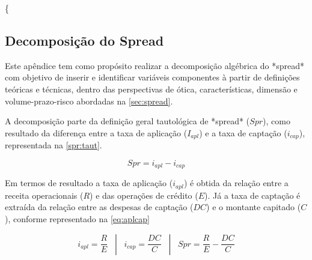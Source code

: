 \documentclass[
  12pt,
  12pt,
  openright,
  oneside,
  a4paper,
  chapter=TITLE,
  section=TITLE,
  subsection=TITLE,
  subsubsection=TITLE,
  english,
  portugues,
  sumario=tradicional]{abntex2}
\begin{document}
\postextual

\printbibliography[title={REFERÊNCIAS}]

\postextual



\{

\begin{apendicesenv}

\vspace{-10mm}

\renewcommand{\thechapter}{\arabic{chapter}}

\chapter{Decomposição do Spread}\label{apendicea}

Este apêndice tem como propósito realizar a decomposição algébrica do *spread* com objetivo de inserir e identificar variáveis componentes à partir de definições teóricas e técnicas, dentro das perspectivas de ótica, características, dimensão e volume-prazo-risco abordadas na \autoref{sec:spread}.

A decomposição parte da definição geral tautológica de *spread* ($Spr$), como resultado da diferença entre a taxa de aplicação ($I_{apl}$) e a taxa de captação ($i_{cap}$), representada na \autoref{spr:taut}.



\begin{equation}\label{spr:taut}
Spr = i_{apl} - i_{cap}
\end{equation}



Em termos de resultado a taxa de aplicação ($i_{apl}$) é obtida da relação entre a receita operacionais ($R$) e das operações de crédito ($E$). Já a taxa de captação é extraída da relação entre as despesas de captação ($DC$) e o montante capitado ($C$), conforme representado na \autoref{eq:aplcap}


\begin{equation}\label{eq:aplcap}
i_{apl} = \frac{R}{E}  \hspace{10pt} |  \hspace{10pt} i_{cap} =  \frac{DC}{C}  \hspace{10pt} |  \hspace{10pt} Spr =  \frac{R_{}}{E} -  \frac{DC}{C}
\end{equation}



\end{apendicesenv}
\end{document}
